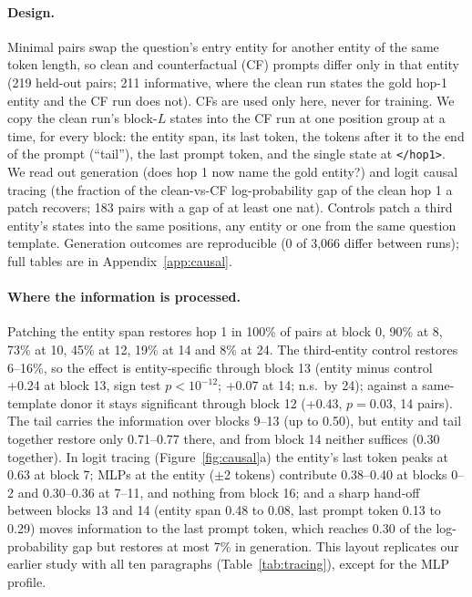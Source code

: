 \documentclass[11pt]{article}
\begin{document}
\paragraph{Design.} Minimal pairs swap the question's entry entity for another entity of the same token length, so clean and counterfactual (CF) prompts differ only in that entity (219 held-out pairs; 211 informative, where the clean run states the gold hop-1 entity and the CF run does not). CFs are used only here, never for training. We copy the clean run's block-$L$ states into the CF run at one position group at a time, for every block: the entity span, its last token, the tokens after it to the end of the prompt (``tail''), the last prompt token, and the single state at \texttt{</hop1>}. We read out generation (does hop 1 now name the gold entity?) and logit causal tracing (the fraction of the clean-vs-CF log-probability gap of the clean hop 1 a patch recovers; 183 pairs with a gap of at least one nat). Controls patch a third entity's states into the same positions, any entity or one from the same question template. Generation outcomes are reproducible (0 of 3,066 differ between runs); full tables are in Appendix~\ref{app:causal}.

\paragraph{Where the information is processed.} Patching the entity span restores hop 1 in 100\% of pairs at block 0, 90\% at 8, 73\% at 10, 45\% at 12, 19\% at 14 and 8\% at 24. The third-entity control restores 6--16\%, so the effect is entity-specific through block 13 (entity minus control +0.24 at block 13, sign test $p{<}10^{-12}$; +0.07 at 14; n.s.\ by 24); against a same-template donor it stays significant through block 12 (+0.43, $p{=}0.03$, 14 pairs). The tail carries the information over blocks 9--13 (up to 0.50), but entity and tail together restore only 0.71--0.77 there, and from block 14 neither suffices (0.30 together). In logit tracing (Figure~\ref{fig:causal}a) the entity's last token peaks at 0.63 at block 7; MLPs at the entity ($\pm$2 tokens) contribute 0.38--0.40 at blocks 0--2 and 0.30--0.36 at 7--11, and nothing from block 16; and a sharp hand-off between blocks 13 and 14 (entity span 0.48 to 0.08, last prompt token 0.13 to 0.29) moves information to the last prompt token, which reaches 0.30 of the log-probability gap but restores at most 7\% in generation. This layout replicates our earlier study with all ten paragraphs (Table~\ref{tab:tracing}), except for the MLP profile.
\end{document}
